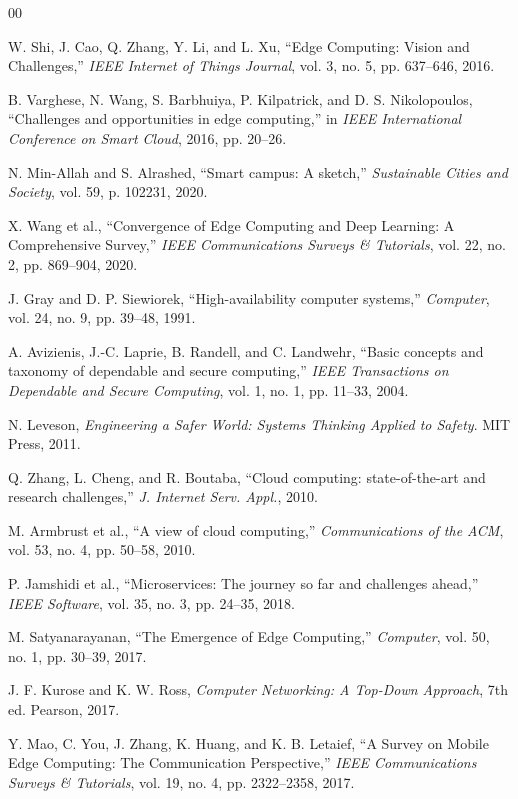 \documentclass[conference]{IEEEtran}
\begin{document}
\begin{thebibliography}{00}

 W. Shi, J. Cao, Q. Zhang, Y. Li, and L. Xu, ``Edge Computing: Vision and Challenges,'' \textit{IEEE Internet of Things Journal}, vol. 3, no. 5, pp. 637--646, 2016.

 B. Varghese, N. Wang, S. Barbhuiya, P. Kilpatrick, and D. S. Nikolopoulos, ``Challenges and opportunities in edge computing,'' in \textit{IEEE International Conference on Smart Cloud}, 2016, pp. 20--26.

 N. Min-Allah and S. Alrashed, ``Smart campus: A sketch,'' \textit{Sustainable Cities and Society}, vol. 59, p. 102231, 2020.

 X. Wang et al., ``Convergence of Edge Computing and Deep Learning: A Comprehensive Survey,'' \textit{IEEE Communications Surveys \& Tutorials}, vol. 22, no. 2, pp. 869--904, 2020.

 J. Gray and D. P. Siewiorek, ``High-availability computer systems,'' \textit{Computer}, vol. 24, no. 9, pp. 39--48, 1991.

 A. Avizienis, J.-C. Laprie, B. Randell, and C. Landwehr, ``Basic concepts and taxonomy of dependable and secure computing,'' \textit{IEEE Transactions on Dependable and Secure Computing}, vol. 1, no. 1, pp. 11--33, 2004.

 N. Leveson, \textit{Engineering a Safer World: Systems Thinking Applied to Safety}. MIT Press, 2011.

 Q. Zhang, L. Cheng, and R. Boutaba, ``Cloud computing: state-of-the-art and research challenges,'' \textit{J. Internet Serv. Appl.}, 2010.

 M. Armbrust et al., ``A view of cloud computing,'' \textit{Communications of the ACM}, vol. 53, no. 4, pp. 50--58, 2010.

 P. Jamshidi et al., ``Microservices: The journey so far and challenges ahead,'' \textit{IEEE Software}, vol. 35, no. 3, pp. 24--35, 2018.

 M. Satyanarayanan, ``The Emergence of Edge Computing,'' \textit{Computer}, vol. 50, no. 1, pp. 30--39, 2017.

 J. F. Kurose and K. W. Ross, \textit{Computer Networking: A Top-Down Approach}, 7th ed. Pearson, 2017.

 Y. Mao, C. You, J. Zhang, K. Huang, and K. B. Letaief, ``A Survey on Mobile Edge Computing: The Communication Perspective,'' \textit{IEEE Communications Surveys \& Tutorials}, vol. 19, no. 4, pp. 2322--2358, 2017.


\end{thebibliography}
\end{document}
